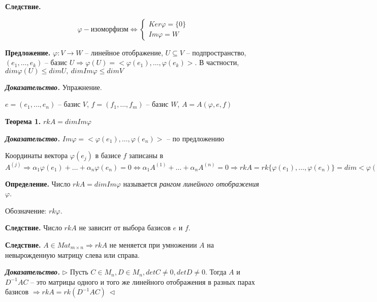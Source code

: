 \vspace{\baselineskip}
\textbf{Следствие.}  

\[
	\varphi - изоморфизм \Leftrightarrow \begin{cases}
		Ker \varphi = \{0\} \\
		Im \varphi = W
	\end{cases}
\]

\vspace{\baselineskip}
\textbf{Предложение.} $\varphi : V \rightarrow W$ -- линейное отображение, $U \subseteq V$ -- подпространство, $(e_1, \dots, e_k)$ -- базис $U \Rightarrow \varphi (U) = < \varphi(e_1), \dots, \varphi (e_k)>$. В частности, $dim \varphi (U) \leq dim U, \ dim Im \varphi \leq dim V$

\vspace{\baselineskip}
\textbf{\textit{Доказательство.}} Упражнение.

\vspace{\baselineskip}
$e = (e_1, \dots, e_n)$ -- базис $V$, $f = (f_1, \dots, f_m)$ -- базис $W$, $A = A(\varphi, e, f)$

\vspace{\baselineskip}
\textbf{Теорема 1.} $rkA = dim Im \varphi$

\vspace{\baselineskip}
\textbf{\textit{Доказательство.}} $Im \varphi = <\varphi(e_1), \dots, \varphi(e_n)>$ -- по предложению

Координаты вектора $\varphi(e_j)$ в базисе $f$ записаны в $A^{(j)} \Rightarrow \alpha_1 \varphi(e_1) + \dots + \alpha_n \varphi(e_n) = 0 \Leftrightarrow \alpha_1 A^{(1)} + \dots + \alpha_n A^{(n)} = 0 \Rightarrow rkA = rk \{\varphi(e_1), \dots, \varphi(e_n) \} = dim <\varphi(e_1), \dots, \varphi(e_n)> = dim Im \varphi \ \lhd$

\vspace{\baselineskip}
\textbf{Определение.} Число $rkA = dim Im \varphi$ называется \textit{рангом линейного отображения} $\varphi$.

Обозначение: $rk \varphi$.

\vspace{\baselineskip}
\textbf{Следствие.} Число $rkA$ не зависит от выбора базисов $e$ и $f$.

\vspace{\baselineskip}
\textbf{Следствие.} $A \in Mat_{m \times n} \Rightarrow rkA$ не меняется при умножении $A$ на невырожденную матрицу слева или справа.

\vspace{\baselineskip}
\textbf{\textit{Доказательство.}} $\rhd$ Пусть $C \in M_n, D \in M_n, detC \neq 0, detD \neq 0$. Тогда $A$ и $D^{-1} A C$ -- это матрицы одного и того же линейного отображения в разных парах базисов $\Rightarrow rkA = rk (D^{-1} A C) \ \lhd$

